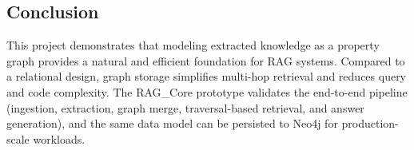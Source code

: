 \subsection{Conclusion}
This project demonstrates that modeling extracted knowledge as a property graph provides a natural and efficient foundation for RAG systems. Compared to a relational design, graph storage simplifies multi-hop retrieval and reduces query and code complexity. The RAG\_Core prototype validates the end-to-end pipeline (ingestion, extraction, graph merge, traversal-based retrieval, and answer generation), and the same data model can be persisted to Neo4j for production-scale workloads.
